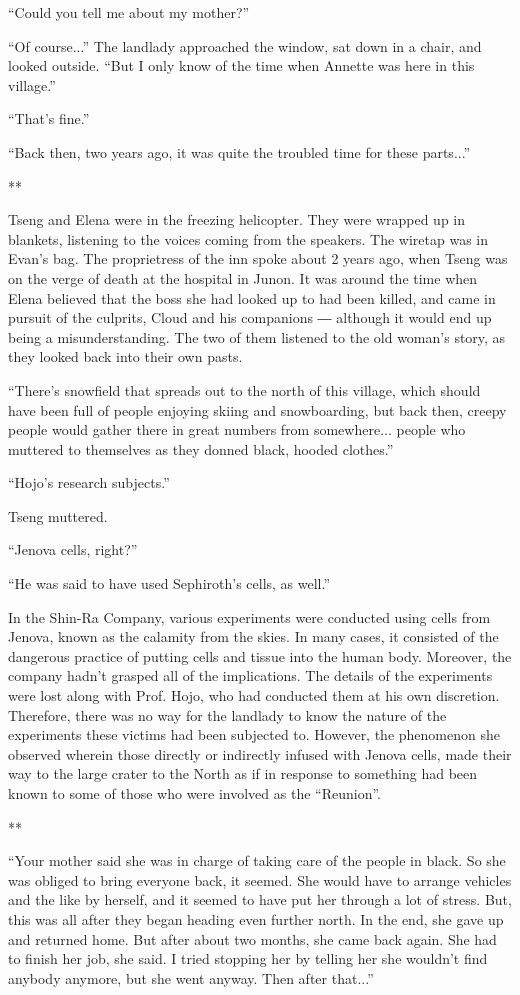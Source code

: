 \documentclass[oneside]{book}
\begin{document}
“Could you tell me about my mother?”

“Of course...” The landlady approached the window, sat down in a chair, and looked outside. “But I only know of the time when Annette was here in this village.”

“That’s fine.”

“Back then, two years ago, it was quite the troubled time for these parts...”

**

Tseng and Elena were in the freezing helicopter. They were wrapped up in blankets, listening to the voices coming from the speakers. The wiretap was in Evan’s bag. The proprietress of the inn spoke about 2 years ago, when Tseng was on the verge of death at the hospital in Junon. It was around the time when Elena believed that the boss she had looked up to had been killed, and came in pursuit of the culprits, Cloud and his companions ― although it would end up being a misunderstanding. The two of them listened to the old woman’s story, as they looked back into their own pasts.

“There’s snowfield that spreads out to the north of this village, which should have been full of people enjoying skiing and snowboarding, but back then, creepy people would gather there in great numbers from somewhere... people who muttered to themselves as they donned black, hooded clothes.”

“Hojo’s research subjects.”

Tseng muttered.

“Jenova cells, right?”

“He was said to have used Sephiroth’s cells, as well.”

In the Shin-Ra Company, various experiments were conducted using cells from Jenova, known as the calamity from the skies. In many cases, it consisted of the dangerous practice of putting cells and tissue into the human body. Moreover, the company hadn’t grasped all of the implications. The details of the experiments were lost along with Prof. Hojo, who had conducted them at his own discretion. Therefore, there was no way for the landlady to know the nature of the experiments these victims had been subjected to. However, the phenomenon she observed wherein those directly or indirectly infused with Jenova cells, made their way to the large crater to the North as if in response to something had been known to some of those who were involved as the “Reunion”.

**

“Your mother said she was in charge of taking care of the people in black. So she was obliged to bring everyone back, it seemed. She would have to arrange vehicles and the like by herself, and it seemed to have put her through a lot of stress. But, this was all after they began heading even further north. In the end, she gave up and returned home. But after about two months, she came back again. She had to finish her job, she said. I tried stopping her by telling her she wouldn’t find anybody anymore, but she went anyway. Then after that...”
\end{document}
